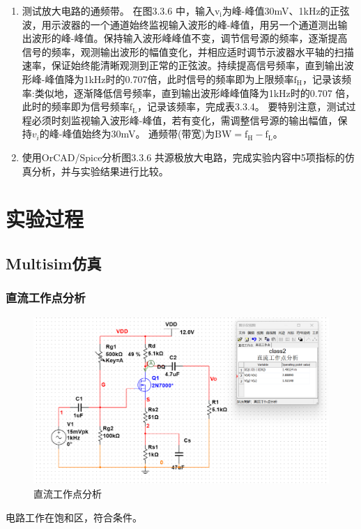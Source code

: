 \documentclass[a4paper]{article}
\theoremstyle{definition}
\theoremstyle{plain}
\theoremstyle{remark}
\begin{document}
\begin{enumerate}
	\item 测试放大电路的通频带。
	      在图3.3.6 中，输入$\mathrm{v_i}$为峰-峰值30mV、1kHz的正弦波，用示波器的一个通道始终监视输入波形的峰-峰值，用另一个通道测出输出波形的峰-峰值。保持输入波形峰峰值不变，调节信号源的频率，逐渐提高信号的频率，观测输出波形的幅值变化，并相应适时调节示波器水平轴的扫描速率，保证始终能清晰观测到正常的正弦波。持续提高信号频率，直到输出波形峰-峰值降为1kHz时的0.707倍，此时信号的频率即为上限频率$\mathrm{f_H}$，记录该频率:类似地，逐渐降低信号频率，直到输出波形峰峰值降为1kHz时的0.707 倍，此时的频率即为信号频率$\mathrm{f_L}$，记录该频率，完成表3.3.4。 要特别注意，测试过程必须时刻监视输入波形峰-峰值，若有变化，需调整信号源的输出幅值，保持$v_i$的峰-峰值始终为30mV。
	      通频带(带宽)为$\mathrm{BW=f_H-f_L}$。
	\item 使用OrCAD/Spice分析图3.3.6 共源极放大电路，完成实验内容中5项指标的仿真分析，并与实验结果进行比较。


\end{enumerate}




\section{实验过程}
\subsection{Multisim仿真}
\subsubsection{直流工作点分析}
\begin{figure}[H]
	\centering
	\includegraphics[width=1\textwidth]{直流工作点分析}
	\caption{直流工作点分析}
	\label{直流工作点分析}
\end{figure}
电路工作在饱和区，符合条件。
\end{document}
